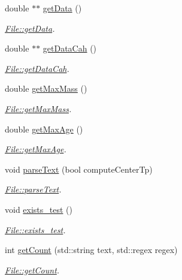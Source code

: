 \begin{DoxyCompactItemize}
\item 
double $\ast$$\ast$ \hyperlink{classFile_a982f88fed4bf555b9f3ba69c37b5f0a7}{get\+Data} ()
\begin{DoxyCompactList}\small\item\em \hyperlink{classFile_a982f88fed4bf555b9f3ba69c37b5f0a7}{File\+::get\+Data}. \end{DoxyCompactList}\item 
double $\ast$$\ast$ \hyperlink{classFile_a8f59da39256bf141404043e3a93f9654}{get\+Data\+Cah} ()
\begin{DoxyCompactList}\small\item\em \hyperlink{classFile_a8f59da39256bf141404043e3a93f9654}{File\+::get\+Data\+Cah}. \end{DoxyCompactList}\item 
double \hyperlink{classFile_abf8e0e8e4e7d8a4ff99e327a8d30c394}{get\+Max\+Mass} ()
\begin{DoxyCompactList}\small\item\em \hyperlink{classFile_abf8e0e8e4e7d8a4ff99e327a8d30c394}{File\+::get\+Max\+Mass}. \end{DoxyCompactList}\item 
double \hyperlink{classFile_ab9f463bb8afd01c69d323872e2f3d275}{get\+Max\+Age} ()
\begin{DoxyCompactList}\small\item\em \hyperlink{classFile_ab9f463bb8afd01c69d323872e2f3d275}{File\+::get\+Max\+Age}. \end{DoxyCompactList}\item 
void \hyperlink{classFile_a986cac1668c92bf580eb20244fefab02}{parse\+Text} (bool compute\+Center\+Tp)
\begin{DoxyCompactList}\small\item\em \hyperlink{classFile_a986cac1668c92bf580eb20244fefab02}{File\+::parse\+Text}. \end{DoxyCompactList}\item 
void \hyperlink{classFile_a152b94a16617a9df570352696bfea31a}{exists\+\_\+test} ()
\begin{DoxyCompactList}\small\item\em \hyperlink{classFile_a152b94a16617a9df570352696bfea31a}{File\+::exists\+\_\+test}. \end{DoxyCompactList}\item 
int \hyperlink{classFile_acdb459909f2c43d3a4d84426276b41c3}{get\+Count} (std\+::string text, std\+::regex regex)
\begin{DoxyCompactList}\small\item\em \hyperlink{classFile_acdb459909f2c43d3a4d84426276b41c3}{File\+::get\+Count}. \end{DoxyCompactList}\item 

\end{DoxyCompactItemize}
